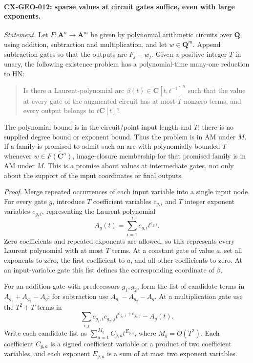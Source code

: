 \paragraph{CX-GEO-012: sparse values at circuit gates suffice, even with large exponents.}
\emph{Statement.} Let $F:\mathbf A^n\to\mathbf A^m$ be given by
polynomial arithmetic circuits over $\mathbf Q$, using addition,
subtraction and multiplication, and let $w\in\mathbf Q^m$.
Append subtraction gates so that the outputs are $F_j-w_j$.
Given a positive integer $T$ in unary, the following existence problem
has a polynomial-time many-one reduction to HN:
\begin{quote}
Is there a Laurent-polynomial arc
$\beta(t)\in\mathbf C[t,t^{-1}]^n$ such that the value at every gate
of the augmented circuit has at most $T$ nonzero terms, and every output
belongs to $t\mathbf C[t]$?
\end{quote}
The polynomial bound is in the circuit/point input length and $T$;
there is no supplied degree bound or exponent bound. Thus the problem
is in AM under $M$. If a family is promised to admit such an arc with
polynomially bounded $T$ whenever $w\in\overline{F(\mathbf C^n)}$,
image-closure membership for that promised family is in AM under $M$.
This is a promise about values at intermediate gates, not only about the
support of the input coordinates or final outputs.

\emph{Proof.} Merge repeated occurrences of each input variable into a
single input node. For every gate $g$, introduce $T$ coefficient
variables $c_{g,i}$ and $T$ integer exponent variables $e_{g,i}$,
representing the Laurent polynomial
\[
                       A_g(t)=\sum_{i=1}^T c_{g,i}t^{e_{g,i}}.
\]
Zero coefficients and repeated exponents are allowed, so this represents
every Laurent polynomial with at most $T$ terms. At a constant gate
of value $a$, set all exponents to zero, the first coefficient to $a$,
and all other coefficients to zero. At an input-variable gate this list
defines the corresponding coordinate of $\beta$.

For an addition gate with predecessors $g_1,g_2$, form the list of
candidate terms in $A_{g_1}+A_{g_2}-A_g$; for subtraction use
$A_{g_1}-A_{g_2}-A_g$. At a multiplication gate use the $T^2+T$ terms
in
\[
              \sum_{i,j}c_{g_1,i}c_{g_2,j}
                         t^{e_{g_1,i}+e_{g_2,j}}-A_g(t).
\]
Write each candidate list as
$\sum_{a=1}^{M_g}C_{g,a}t^{E_{g,a}}$, where $M_g=O(T^2)$.
Each coefficient $C_{g,a}$ is a signed coefficient variable or a
product of two coefficient variables, and each exponent $E_{g,a}$ is
a sum of at most two exponent variables.

